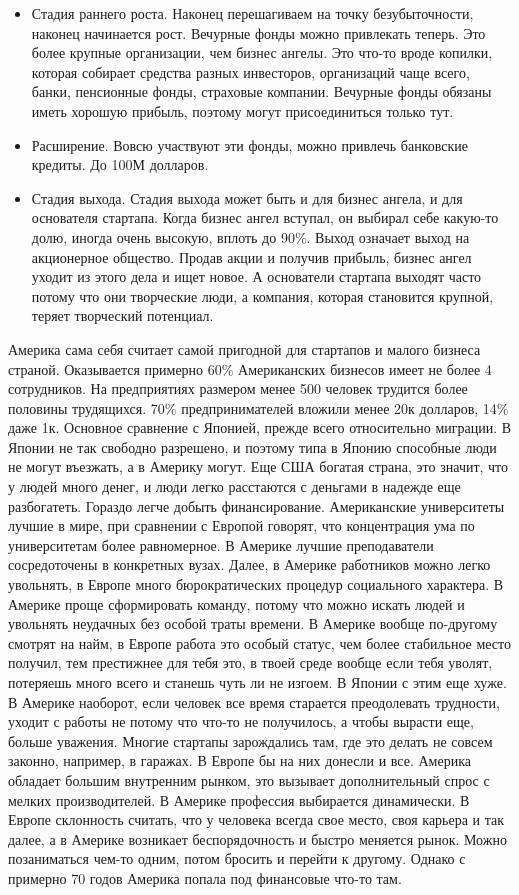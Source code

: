 \documentclass[a4paper, 12pt]{article}
\begin{document}
\begin{itemize}
\item Стадия раннего роста. Наконец перешагиваем на точку безубыточности, наконец начинается рост. Вечурные фонды можно привлекать теперь. Это более крупные организации, чем бизнес ангелы. Это что-то вроде копилки, которая собирает средства разных инвесторов, организаций чаще всего, банки, пенсионные фонды, страховые компании. Вечурные фонды обязаны иметь хорошую прибыль, поэтому могут присоединиться только тут. 
\item Расширение. Вовсю участвуют эти фонды, можно привлечь банковские кредиты. До 100М долларов. 
\item Стадия выхода. Стадия выхода может быть и для бизнес ангела, и для основателя стартапа. Когда бизнес ангел вступал, он выбирал себе какую-то долю, иногда очень высокую, вплоть до 90\%. Выход означает выход на акционерное общество. Продав акции и получив прибыль, бизнес ангел уходит из этого дела и ищет новое. А основатели стартапа выходят часто потому что они творческие люди, а компания, которая становится крупной, теряет творческий потенциал. 
\end{itemize}


Америка сама себя считает самой пригодной для стартапов и малого бизнеса страной. Оказывается примерно 60\% Американских бизнесов имеет не более 4 сотрудников. На предприятиях размером менее 500 человек трудится более половины трудящихся. 70\% предпринимателей вложили менее 20к долларов, 14\% даже 1к. Основное сравнение с Японией, прежде всего относительно миграции. В Японии не так свободно разрешено, и поэтому типа в Японию способные люди не могут въезжать, а в Америку могут. Еще США богатая страна, это значит, что у людей много денег, и люди легко расстаются с деньгами в надежде еще разбогатеть. Гораздо легче добыть финансирование. Американские университеты лучшие в мире, при сравнении с Европой говорят, что концентрация ума по университетам более равномерное. В Америке лучшие преподаватели сосредоточены в конкретных вузах. Далее, в Америке работников можно легко увольнять, в Европе много бюрократических процедур социального характера. В Америке проще сформировать команду, потому что можно искать людей и увольнять неудачных без особой траты времени. В Америке вообще по-другому смотрят на найм, в Европе работа это особый статус, чем более стабильное место получил, тем престижнее для тебя это, в твоей среде вообще если тебя уволят, потеряешь много всего и станешь чуть ли не изгоем. В Японии с этим еще хуже. В Америке наоборот, если человек все время старается преодолевать трудности, уходит с работы не потому что что-то не получилось, а чтобы вырасти еще, больше уважения. Многие стартапы зарождались там, где это делать не совсем законно, например, в гаражах. В Европе бы на них донесли и все. Америка обладает большим внутренним рынком, это вызывает дополнительный спрос с мелких производителей. В Америке профессия выбирается динамически. В Европе склонность считать, что у человека всегда свое место, своя карьера и так далее, а в Америке возникает беспорядочность и быстро меняется рынок. Можно позаниматься чем-то одним, потом бросить и перейти к другому. Однако с примерно 70 годов Америка попала под финансовые что-то там. 
\end{document}
